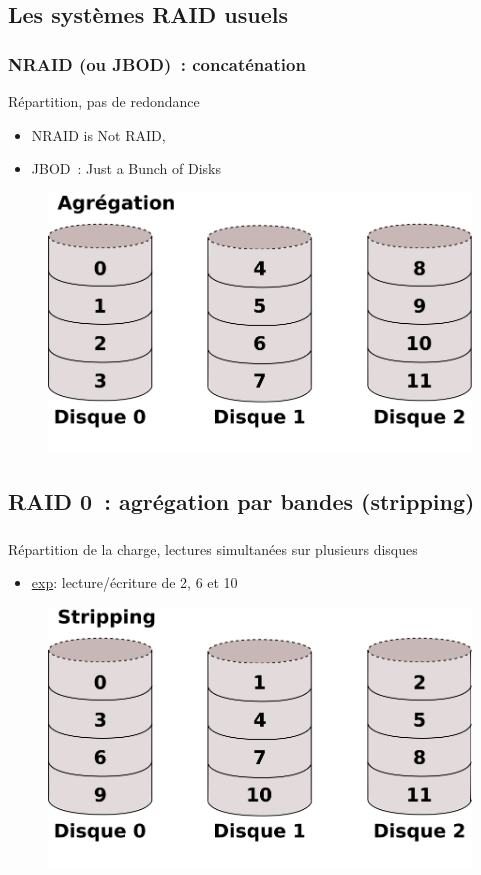 \subsection{Les systèmes RAID usuels}
\begin{frame}
  \frametitle{NRAID (ou JBOD)~: concaténation}
  Répartition, pas de redondance
  \begin{itemize}
  \item NRAID is \alert{Not R}AID, 
  \item JBOD~: \alert{Just a Bunch of Disks}
  \end{itemize}
  \begin{figure}
    \includegraphics[width=0.8\linewidth]{fig3/NRAID}
  \end{figure}
\end{frame}

\subsection[RAID 0]{RAID 0~: agrégation par bandes (stripping)}
\begin{frame}
  \frametitle{\insertsubsection}
  \alert{Répartition} de la charge, \alert{lectures simultanées} sur plusieurs disques
  \begin{itemize}
  \item \underline{exp}: lecture/écriture de 2, 6 et 10
  \end{itemize}
  \begin{figure}
    \includegraphics[width=0.8\linewidth]{fig3/RAID0}
  \end{figure}
\end{frame}

